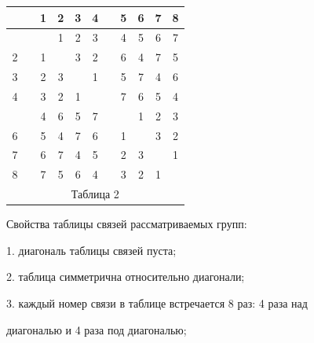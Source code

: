 \begin{center}


\begin{tabular}{ccccccccccc}


\ & \vline & 1 & 2 & 3 & 4 & \vline & 5 & 6 & 7 & 8 \\


\hline


 1 & \vline & \ & 1 & 2 & 3 & \vline & 4 & 5 & 6 & 7 \\


2 & \vline & 1 & \ & 3 & 2 & \vline & 6 & 4 & 7 & 5 \\


3 & \vline & 2 & 3 & \ & 1 & \vline & 5 & 7 & 4 & 6 \\


4 & \vline & 3 & 2 & 1 & \ & \vline & 7 & 6 & 5 & 4 \\


\hline


 5 & \vline & 4 & 6 & 5 & 7 & \vline & \ & 1 & 2 & 3 \\


6 & \vline & 5 & 4 & 7 & 6 & \vline & 1 & \ & 3 & 2 \\


7 & \vline & 6 & 7 & 4 & 5 & \vline & 2 & 3 & \ & 1 \\


8 & \vline & 7 & 5 & 6 & 4 & \vline & 3 & 2 & 1 & \ \\


\multicolumn{11}{c}{ Таблица 2}


\end{tabular}


\end{center}


\smallskip





Свойства таблицы связей рассматриваемых групп:





1. диагональ таблицы связей пуста;





2. таблица симметрична относительно диагонали;





3. каждый номер связи в таблице встречается 8 раз: 4 раза над 


диагональю и 4 раза под диагональю;





